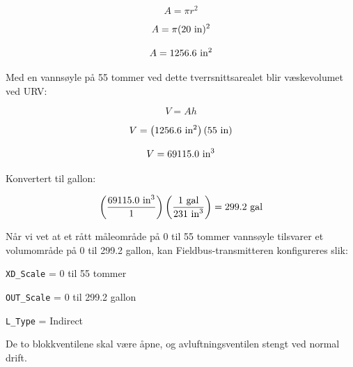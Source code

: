 $$A = \pi r^2$$

$$A = \pi (20 \hbox{ in})^2$$

$$A = 1256.6 \hbox{ in}^2$$

Med en vannsøyle på 55 tommer ved dette tverrsnittsarealet blir væskevolumet ved URV:

$$V = A h$$

$$V = \left(1256.6 \hbox{ in}^2\right) (55 \hbox{ in})$$

$$V = 69115.0 \hbox{ in}^3$$

Konvertert til gallon:

$$\left(69115.0 \hbox{ in}^3 \over 1 \right) \left(1 \hbox{ gal} \over 231 \hbox{ in}^3 \right) = 299.2 \hbox{ gal}$$

\vskip 10pt

Når vi vet at et rått måleområde på 0 til 55 tommer vannsøyle tilsvarer et volumområde på 0 til 299.2 gallon, kan Fieldbus-transmitteren konfigureres slik:

\vskip 10pt

{\tt XD\_Scale} = 0 til 55 tommer

\vskip 10pt

{\tt OUT\_Scale} = 0 til 299.2 gallon

\vskip 10pt

{\tt L\_Type} = Indirect

\vskip 10pt

De to blokkventilene skal være åpne, og avluftningsventilen stengt ved normal drift.




